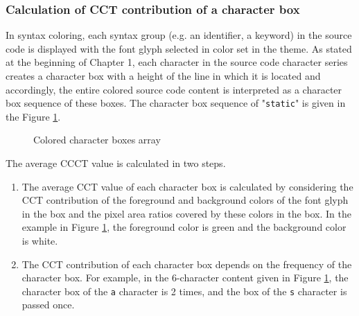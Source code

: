 \documentclass{article}
\begin{document}
\subsubsection{Calculation of CCT contribution of a character box}

In syntax coloring, each syntax group (e.g. an identifier, a keyword) in the source code is displayed with the font
glyph selected in color set in the theme. As stated at the beginning of Chapter 1, each character in the source code character series creates a character box with a height of the line in which it is located and accordingly, the entire colored source code content is interpreted as a character box sequence of these boxes. The character box sequence of "\texttt{static}" is given in the Figure \ref{fig:line_of_charboxes}.

\begin{comment}
TR: Bölüm \ref{sec:material-methods} başlangıcında da belirtildiği gibi kaynak kod
karakter dizisindeki her bir karakter içinde bulunduğu satırın yüksekliğine sahip bir karakter kutusu oluşturmakta ve
buna göre renklendirilmiş kaynak kod içeriğinin tamamı bu kutulardan oluşan bir karakter kutusu dizisi olarak
yorumlanmaktadır. Şekil \ref{fig:colored_code}'de verilen renklendirilmiş kod örneği dikkate alındığında bu karakter
kutusu dizisinde "\texttt{static}" anahtar kelimesine ilişkin bölüm Şekil \ref{fig:line_of_charboxes}'de verilmiştir.
\end{comment}

\begin{figure}[H]
  \centering
  
  \caption{Colored character boxes array}
  \label{fig:line_of_charboxes}
\end{figure}

The average CCCT value is calculated in two steps.

\begin{enumerate}
  \item The average CCT value of each character box is calculated by considering the CCT contribution of the foreground and background colors of the font glyph in the box and the pixel area ratios covered by these colors in the box. In the example in Figure \ref{fig:line_of_charboxes}, the foreground color is green and the background color is white.

  \item The CCT contribution of each character box depends on the frequency of the character box. For example, in the 6-character content given in Figure \ref{fig:line_of_charboxes}, the character box of the \texttt{a} character is 2 times, and the box of the \texttt{s} character is passed once.
\end{enumerate}
\end{document}
